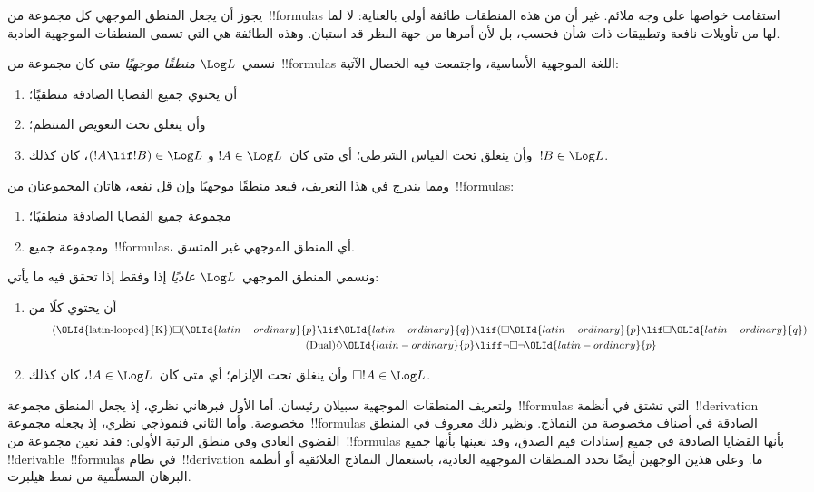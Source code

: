 \documentclass[../../../include/open-logic-section]{subfiles}
\begin{document}


يجوز أن يجعل المنطق الموجهي كل مجموعة من~!!{formula}s استقامت خواصها
على وجه ملائم. غير أن من هذه المنطقات طائفة أولى بالعناية: لا لما لها
من تأويلات نافعة وتطبيقات ذات شأن فحسب، بل لأن أمرها من جهة النظر قد
استبان. وهذه الطائفة هي التي تسمى المنطقات الموجهية العادية.

\begin{defn}
نسمي~$\Log L$ \emph{منطقًا موجهيًا} متى كان مجموعة من~!!{formula}s
اللغة الموجهية الأساسية، واجتمعت فيه الخصال الآتية:
\begin{enumerate}
\item أن يحتوي جميع القضايا الصادقة منطقيًا؛
\item وأن ينغلق تحت التعويض المنتظم؛
\item وأن ينغلق تحت القياس الشرطي؛ أي متى كان~$!A \in \Log L$ و
  $(!A \lif !B) \in \Log L$، كان كذلك~$!B \in \Log L$.
\end{enumerate}
\end{defn}

\begin{ex}
ومما يندرج في هذا التعريف، فيعد منطقًا موجهيًا وإن قل نفعه، هاتان
المجموعتان من~!!{formula}s:
\begin{enumerate}
\item مجموعة جميع القضايا الصادقة منطقيًا؛
\item ومجموعة جميع~!!{formula}s، أي المنطق الموجهي غير المتسق.
\end{enumerate}
\end{ex}

\begin{defn}
ونسمي المنطق الموجهي~$\Log L$ \emph{عاديًا} إذا وفقط إذا تحقق فيه ما يأتي:
\begin{enumerate}
\item أن يحتوي كلًا من
\begin{align}
\tag{\OLId{latin-looped}{K}} \Box(\OLId{latin-ordinary}{p} \lif \OLId{latin-ordinary}{q}) & \lif (\Box \OLId{latin-ordinary}{p} \lif \Box \OLId{latin-ordinary}{q}) \\
\tag{Dual} \Diamond \OLId{latin-ordinary}{p} & \liff \lnot \Box \lnot \OLId{latin-ordinary}{p}
\end{align}
\item وأن ينغلق تحت الإلزام؛ أي متى كان~$!A \in \Log L$، كان كذلك
  $\Box !A \in \Log L$.
\end{enumerate}
\end{defn}

ولتعريف المنطقات الموجهية سبيلان رئيسان. أما الأول فبرهاني نظري، إذ
يجعل المنطق مجموعة~!!{formula}s التي تشتق في أنظمة~!!{derivation}
مخصوصة. وأما الثاني فنموذجي نظري، إذ يجعله مجموعة~!!{formula}s الصادقة
في أصناف مخصوصة من النماذج. ونظير ذلك معروف في المنطق القضوي العادي وفي
منطق الرتبة الأولى: فقد نعين مجموعة من~!!{formula}s بأنها القضايا
الصادقة في جميع إسنادات قيم الصدق، وقد نعينها بأنها جميع
!!{derivable}~!!{formula}s في نظام~!!{derivation} ما. وعلى هذين
الوجهين أيضًا تحدد المنطقات الموجهية العادية، باستعمال النماذج
العلائقية أو أنظمة البرهان المسلّمية من نمط هيلبرت.
\end{document}
